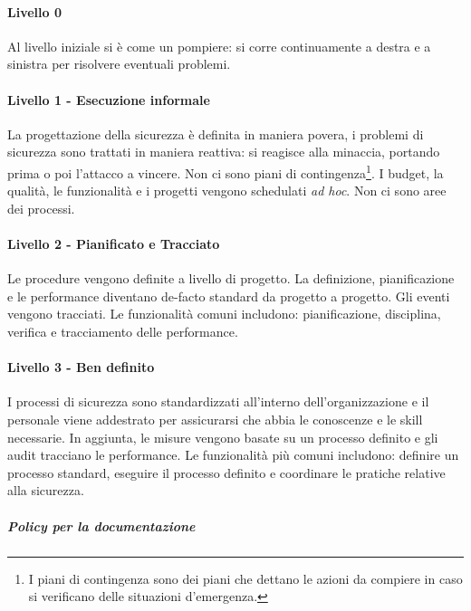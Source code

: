 \paragraph{Livello 0}

Al livello iniziale si è come un pompiere: si corre continuamente a destra e a 
sinistra per risolvere eventuali problemi.

\paragraph{Livello 1 - Esecuzione informale}

La progettazione della sicurezza è definita in maniera povera, i problemi di 
sicurezza sono trattati in maniera reattiva: si reagisce 
alla minaccia, portando prima o poi l'attacco a vincere. Non ci sono piani di 
contingenza\footnote{I piani di contingenza sono dei piani che dettano le 
azioni da compiere in caso si verificano delle situazioni d'emergenza.}. I 
budget, la qualità, le funzionalità e i progetti vengono schedulati \textit{ad 
hoc}. Non ci sono aree dei processi.

\paragraph{Livello 2 - Pianificato e Tracciato}

Le procedure vengono definite a livello di progetto. La definizione, 
pianificazione e le performance diventano de-facto standard da progetto a 
progetto. Gli eventi vengono tracciati. Le funzionalità comuni includono: 
pianificazione, disciplina, verifica e tracciamento delle performance.

\paragraph{Livello 3 - Ben definito}

I processi di sicurezza sono standardizzati all'interno dell'organizzazione e 
il personale viene addestrato per assicurarsi che abbia le conoscenze e le 
skill necessarie. In aggiunta, le misure vengono basate su un processo 
definito e gli audit tracciano le performance. Le funzionalità più comuni 
includono: definire un processo standard, eseguire il processo definito e 
coordinare le pratiche relative alla sicurezza.

\subparagraph*{Policy per la documentazione}

